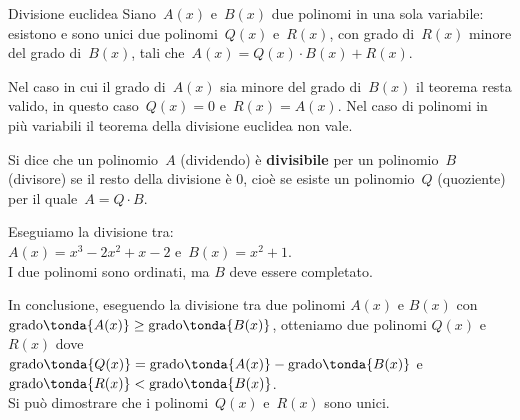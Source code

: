 \begin{teorema}{Divisione euclidea}{}
Siano~\(A(x)\) e~\(B(x)\) due polinomi in una sola variabile: esistono 
e sono unici due polinomi~\(Q(x)\) e~\(R(x)\), con grado di~\(R(x)\)
minore del grado di~\(B(x)\), tali che~\(A(x)=Q(x)\cdot B(x)+R(x)\).
\end{teorema}

\begin{osservazione}{}{} 
Nel caso in cui il grado di~\(A(x)\) sia minore del grado di~\(B(x)\) 
il teorema resta valido, in questo caso~\(Q(x)=0\) e~\(R(x)=A(x)\).
Nel caso di polinomi in più variabili il teorema della divisione 
euclidea non vale.
\end{osservazione}

\begin{definizione}{}{}
Si dice che un polinomio~\(A\) (dividendo) è
 \textbf{divisibile} per un
polinomio~\(B\)  (divisore) se il resto della divisione è \(0\), cioè
se esiste un polinomio~\(Q\) (quoziente) per il quale~\(A = Q \cdot B\).
\end{definizione}

\begin{esempio}{}{}
Eseguiamo la divisione tra: \\
\(A(x)=x^3-2x^2+x-2\) e~\(B(x)=x^2+1\).\\

I due polinomi sono ordinati, ma \(B\) deve essere completato. 

\end{esempio}

In conclusione, eseguendo la divisione tra due polinomi 
\(A(x)\) e \(B(x)\) con \\
\(\text{grado}\tonda{A(x)} \ge \text{grado}\tonda{B(x)}\), 
otteniamo due polinomi \(Q(x)\) e \(R(x)\) dove \\
\(\text{grado}\tonda{Q(x)} = \text{grado}\tonda{A(x)} - 
\text{grado}\tonda{B(x)}\) e 
\(\text{grado}\tonda{R(x)} < \text{grado}\tonda{B(x)}\).\\
Si può dimostrare che i polinomi~\(Q(x)\) e~\(R(x)\) sono unici.

